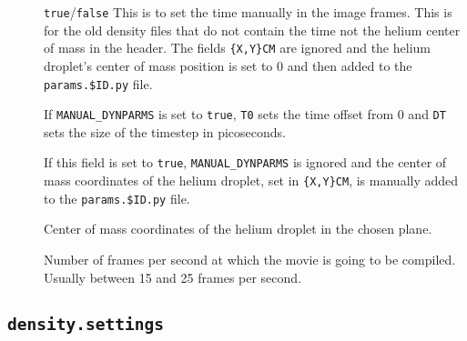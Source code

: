 \documentclass[10pt,a4paper]{article}
\begin{document}
\begin{description}
    \item[] \verb+true+/\verb+false+ This is to set the time manually in the image frames. This is for the old density files that do not contain the time not the helium center of mass in the header. The fields \verb+{X,Y}CM+ are ignored and the helium droplet's center of mass position is set to 0 and then added to the \verb+params.$ID.py+ file.
    \item[] If \verb+MANUAL_DYNPARMS+ is set to \verb+true+, \verb+T0+ sets the time offset from 0 and \verb+DT+ sets the size of the timestep in picoseconds.
    \item[] If this field is set to \verb+true+, \verb+MANUAL_DYNPARMS+ is ignored and the center of mass coordinates of the helium droplet, set in \verb+{X,Y}CM+, is manually added to the \verb+params.$ID.py+ file.
    \item[] Center of mass coordinates of the helium droplet in the chosen plane.
    \item[] Number of frames per second at which the movie is going to be compiled. Usually between 15 and 25 frames per second. 
\end{description}

\subsection{\protect\Verb+density.settings+}
\end{document}
